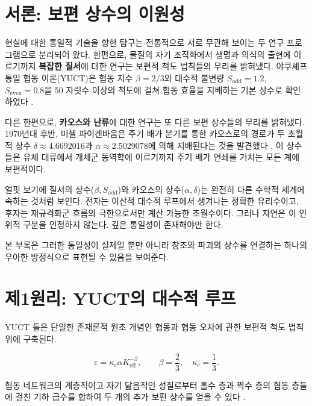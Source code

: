 \documentclass[11pt,a4paper]{article}
\begin{document}
	\section{서론: 보편 상수의 이원성}
	
	현실에 대한 통일적 기술을 향한 탐구는 전통적으로 서로 무관해 보이는 두 연구 프로그램으로 분리되어 왔다. 한편으로, 물질의 자기 조직화에서 생명과 의식의 출현에 이르기까지 \textbf{복잡한 질서}에 대한 연구는 보편적 척도 법칙들의 무리를 밝혀냈다. 야쿠셰프 통일 협동 이론(YUCT)은 협동 지수 \(\beta = 2/3\)와 대수적 불변량 \(S_{\mathrm{odd}} = 1.2\), \(S_{\mathrm{even}} = 0.8\)을 50 자릿수 이상의 척도에 걸쳐 협동 효율을 지배하는 기본 상수로 확인하였다 \cite{Yakushev2026, AppendixAF}.
	
	다른 한편으로, \textbf{카오스와 난류}에 대한 연구는 또 다른 보편 상수들의 무리를 밝혀냈다. 1970년대 후반, 미첼 파이겐바움은 주기 배가 분기를 통한 카오스로의 경로가 두 초월적 상수 \(\delta \approx 4.6692016\)과 \(\alpha \approx 2.5029078\)에 의해 지배된다는 것을 발견했다 \cite{Feigenbaum1978}. 이 상수들은 유체 대류에서 개체군 동역학에 이르기까지 주기 배가 연쇄를 거치는 모든 계에 보편적이다.
	
	얼핏 보기에 질서의 상수(\(\beta, S_{\mathrm{odd}}\))와 카오스의 상수(\(\alpha, \delta\))는 완전히 다른 수학적 세계에 속하는 것처럼 보인다. 전자는 이산적 대수적 루프에서 생겨나는 정확한 유리수이고, 후자는 재규격화군 흐름의 극한으로서만 계산 가능한 초월수이다. 그러나 자연은 이 인위적 구분을 인정하지 않는다. 깊은 통일성이 존재해야만 한다.
	
	본 부록은 그러한 통일성이 실제일 뿐만 아니라 창조와 파괴의 상수를 연결하는 하나의 우아한 방정식으로 표현될 수 있음을 보여준다.
	
	\section{제1원리: YUCT의 대수적 루프}
	
	YUCT 틀은 단일한 존재론적 원초 개념인 협동과 협동 오차에 관한 보편적 척도 법칙 위에 구축된다.
	
	\begin{equation}
		\varepsilon = \kappa_c \alpha K_{\mathrm{eff}}^{-\beta}, \qquad \beta = \frac{2}{3}, \quad \kappa_c = \frac{1}{3}.
	\end{equation}
	
	협동 네트워크의 계층적이고 자기 닮음적인 성질로부터 홀수 층과 짝수 층의 협동 층들에 걸친 기하 급수를 합하여 두 개의 추가 보편 상수를 얻을 수 있다 \cite{AppendixFerra}.
	
\end{document}
